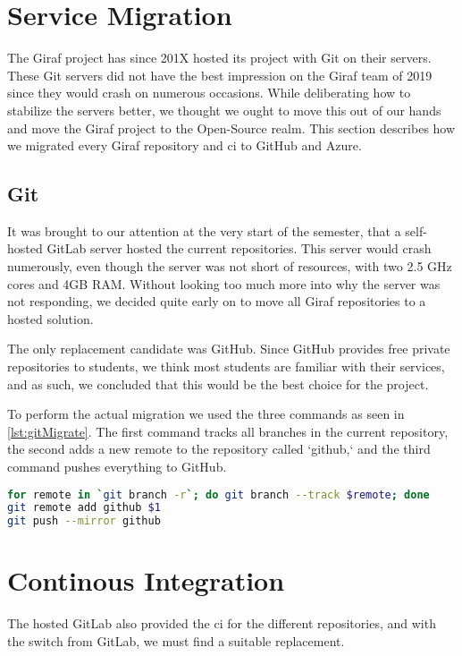 \section{Service Migration}

The Giraf project has since 201X hosted its project with Git on their servers. These Git servers did not have the best impression on the Giraf team of 2019 since they would crash on numerous occasions. While deliberating how to stabilize the servers better, we thought we ought to move this out of our hands and move the Giraf project to the Open-Source realm. This section describes how we migrated every Giraf repository and \gls{ci} to GitHub and Azure.

\subsection{Git}

It was brought to our attention at the very start of the semester, that a self-hosted GitLab server hosted the current repositories. This server would crash numerously, even though the server was not short of resources, with two 2.5 GHz cores and 4GB RAM. Without looking too much more into why the server was not responding, we decided quite early on to move all Giraf repositories to a hosted solution. 

The only replacement candidate was GitHub. Since GitHub provides free private repositories to students, we think most students are familiar with their services, and as such, we concluded that this would be the best choice for the project.

To perform the actual migration we used the three commands as seen in \autoref{lst:gitMigrate}. The first command tracks all branches in the current repository, the second adds a new remote to the repository called `github,` and the third command pushes everything to GitHub.

\begin{lstlisting}[language=bash,label={lst:gitMigrate},caption={Git Migration code}]
for remote in `git branch -r`; do git branch --track $remote; done
git remote add github $1
git push --mirror github
\end{lstlisting}

\section{Continous Integration}

The hosted GitLab also provided the \gls{ci} for the different repositories, and with the switch from GitLab, we must find a suitable replacement.

